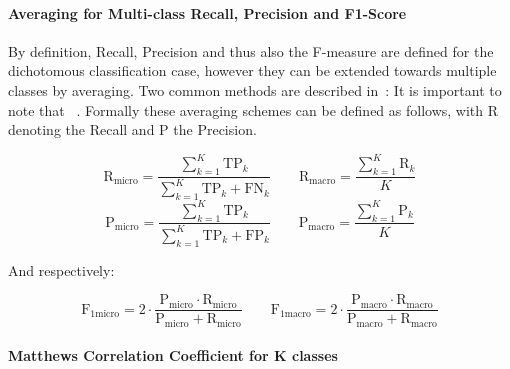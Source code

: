 \paragraph{Averaging for Multi-class Recall, Precision and F1-Score}
\label{par:Averaging for Multi-class Recall, Precision and F1-Score}

By definition, Recall, Precision and thus also the F-measure are defined for the dichotomous classification case, however they can be extended towards multiple classes by averaging. Two common methods are described in~\cite[Chapter 13.6, p.~280]{Manning:2008aa}: 
It is important to note that ~\cite[Chapter 13.6, p.~280]{Manning:2008aa}. Formally these averaging schemes can be defined as follows, with R denoting the Recall and P the Precision.

\begin{equation}
  \text{R}_{\text{micro}} = \frac{\sum_{k=1}^K \text{TP}_k }{ \sum_{k=1}^K \text{TP}_k + \text{FN}_k } \qquad
  \text{R}_{\text{macro}} = \frac{\sum_{k=1}^K \text{R}_k }{ K }
\end{equation}
\begin{equation}
  \text{P}_{\text{micro}} = \frac{\sum_{k=1}^K \text{TP}_k }{ \sum_{k=1}^K \text{TP}_k + \text{FP}_k } \qquad
  \text{P}_{\text{macro}} = \frac{\sum_{k=1}^K \text{P}_k }{ K }
\end{equation}

And respectively:

\begin{equation}
  \text{F}_{1 \text{micro}} = 2 \cdot \frac{\text{P}_{\text{micro}} \cdot \text{R}_{\text{micro}} }{\text{P}_{\text{micro}} + \text{R}_{\text{micro}} } \qquad
  \text{F}_{1 \text{macro}} = 2 \cdot \frac{\text{P}_{\text{macro}} \cdot \text{R}_{\text{macro}} }{\text{P}_{\text{macro}} + \text{R}_{\text{macro}} }
\end{equation}

\paragraph{Matthews Correlation Coefficient for K classes}
\label{par:Matthews Correlation Coefficient for K classes}


